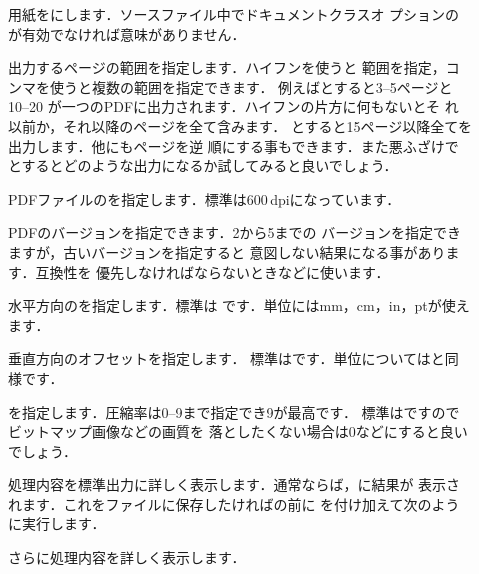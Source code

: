 \begin{description}
 \item[]
%
	   用紙をにします．ソースファイル中でドキュメントクラスオ
	   プションのが有効でなければ意味がありません．
 \item[ ]
%
%
	   出力するページの範囲を指定します．ハイフンを使うと
	   範囲を指定，コンマを使うと複数の範囲を指定できます．
	   例えばとすると3--5ページと10--20
	   が一つのPDFに出力されます．ハイフンの片方に何もないとそ
	   れ以前か，それ以降のページを全て含みます．
	   とすると15ページ以降全てを出力します．他にもページを逆
	   順にする事もできます．また悪ふざけで
	   とするとどのような出力になるか試してみると良いでしょう．
 \item[ ]
%
	   PDFファイルのを指定します．標準は600\,dpiになっています．
 \item[ ]
%
	   PDFのバージョンを指定できます．2から5までの
	   バージョンを指定できますが，古いバージョンを指定すると
	   意図しない結果になる事があります．互換性を
	   優先しなければならないときなどに使います．
 \item[ ]
%
	   水平方向のを指定します．標準は
	   \copt{1.0in}です．単位にはmm，cm，in，ptが使えます．
 \item[ ]
%
	   垂直方向のオフセットを指定します．
	   標準は\copt{1.0in}です．単位についてはと同様です．
 \item[ ]
%
	   を指定します．圧縮率は0--9まで指定でき9が最高です．
	   標準はですのでビットマップ画像などの画質を
	   落としたくない場合は0などにすると良いでしょう．
 \item[]
	   処理内容を標準出力に詳しく表示します．通常ならば，に結果が
	   表示されます．これをファイルに保存したければの前に
	   を付け加えて次のように実行します．

\begin{InTerm}
\end{InTerm}

 \item[]
	   さらに処理内容を詳しく表示します．
\end{description}


